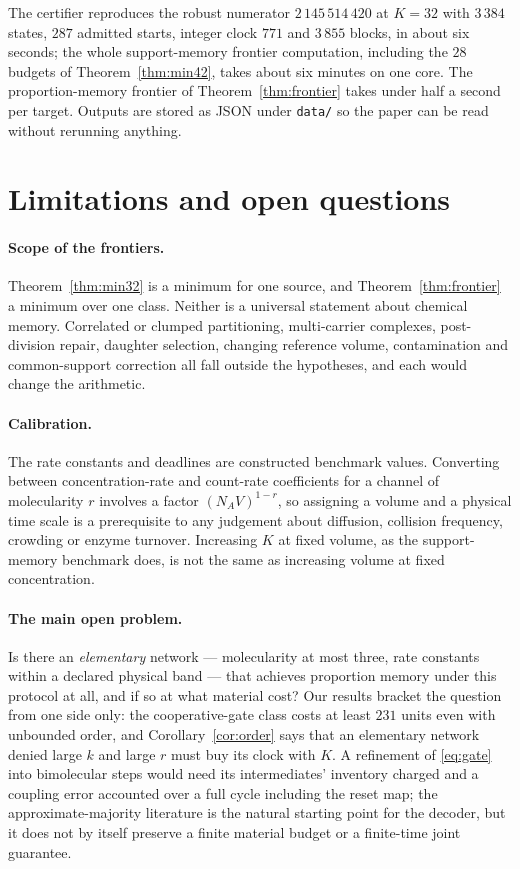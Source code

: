 \documentclass[11pt]{article}
\theoremstyle{plain}
\theoremstyle{definition}
\theoremstyle{remark}
\begin{document}
The certifier reproduces the robust numerator $2\,145\,514\,420$ at
$K=32$ with $3\,384$ states, $287$ admitted starts, integer clock $771$ and
$3\,855$ blocks, in about six seconds; the whole support-memory frontier
computation, including the $28$ budgets of Theorem~\ref{thm:min42}, takes
about six minutes on one core. The proportion-memory frontier of
Theorem~\ref{thm:frontier} takes under half a second per target. Outputs are
stored as JSON under \texttt{data/} so the paper can be read without rerunning
anything.

\section{Limitations and open questions}\label{sec:limits}

\paragraph{Scope of the frontiers.} Theorem~\ref{thm:min32} is a minimum for
one source, and Theorem~\ref{thm:frontier} a minimum over one class. Neither
is a universal statement about chemical memory. Correlated or clumped
partitioning, multi-carrier complexes, post-division repair, daughter
selection, changing reference volume, contamination and common-support
correction all fall outside the hypotheses, and each would change the
arithmetic.

\paragraph{Calibration.} The rate constants and deadlines are constructed
benchmark values. Converting between concentration-rate and count-rate
coefficients for a channel of molecularity $r$ involves a factor
$(N_AV)^{1-r}$, so assigning a volume and a physical time scale is a
prerequisite to any judgement about diffusion, collision frequency, crowding
or enzyme turnover. Increasing $K$ at fixed volume, as the support-memory
benchmark does, is not the same as increasing volume at fixed concentration.

\paragraph{The main open problem.} Is there an \emph{elementary} network ---
molecularity at most three, rate constants within a declared physical band ---
that achieves proportion memory under this protocol at all, and if so at what
material cost? Our results bracket the question from one side only: the
cooperative-gate class costs at least $231$ units even with unbounded order,
and Corollary~\ref{cor:order} says that an elementary network denied large $k$
and large $r$ must buy its clock with $K$. A refinement of \eqref{eq:gate}
into bimolecular steps would need its intermediates' inventory charged and a
coupling error accounted over a full cycle including the reset map; the
approximate-majority literature \cite{condon2020} is the natural starting
point for the decoder, but it does not by itself preserve a finite material
budget or a finite-time joint guarantee.
\end{document}
